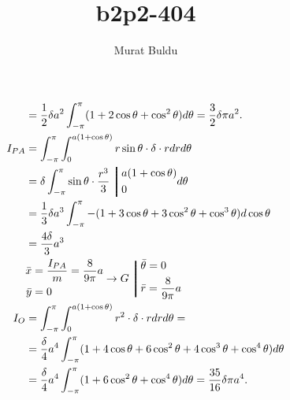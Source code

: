 \documentclass{amsbook}
\title{b2p2-404}
\author{Murat Buldu}
\begin{document}

\begin{align*} 
     &= \frac{1}{2} \delta a^2 \int_{-\pi}^{\pi} (1 + 2 \cos{\theta} + \cos^2{\theta}) d\theta = \frac{3}{2} \delta \pi a^2. \\ 
    I_{PA} &= \int_{-\pi}^{\pi} \int_{0}^{a(1+\cos{\theta})} r \sin{\theta} \cdot \delta \cdot r dr d\theta \\
    &= \delta \int_{-\pi}^{\pi} \sin{\theta} \cdot \frac{r^3}{3}
    \left\bracevert
        \begin{aligned}
            &a(1+\cos{\theta})\\
            &0
        \end{aligned}
        d\theta
    \right. \\
    &= \frac{1}{3} \delta a^3 \int_{-\pi}^{\pi} -(1 + 3 \cos{\theta} + 3 \cos^2{\theta} + \cos^3{\theta}) d\cos{\theta} \\
    &= \frac{4\delta}{3} a^3 \\
    &\begin{aligned}
        \bar{x} &= \frac{I_{PA}}{m} = \frac{8}{9\pi} a \\
        \bar{y} &= 0 \\
    \end{aligned}
    \rightarrow
        G\left\bracevert
            \begin{aligned}
                &\bar{\theta} = 0\\
                &\bar{r} = \frac{8}{9\pi} a
            \end{aligned}
        \right. \\
    I_{O} &= \int_{-\pi}^{\pi} \int_{0}^{a(1+\cos{\theta})} r^2 \cdot \delta \cdot r dr d\theta = \\
    &= \frac{\delta}{4} a^4 \int_{-\pi}^{\pi} (1 + 4 \cos{\theta} + 6 \cos^2{\theta} + 4 \cos^3{\theta} + \cos^4{\theta}) d\theta \\
    &= \frac{\delta}{4} a^4 \int_{-\pi}^{\pi} (1 + 6 \cos^2{\theta} + \cos^4{\theta}) d\theta = \frac{35}{16} \delta \pi a^4.
\end{align*} 
\end{document}
